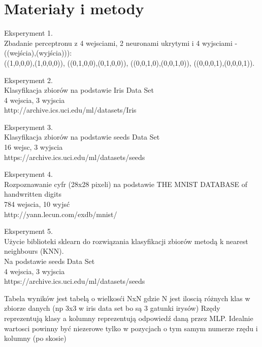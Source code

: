 \documentclass{classrep}
\begin{document}
\section{Materiały i metody}
{Eksperyment 1.\\
Zbadanie perceptronu z 4 wejsciami, 2 neuronami ukrytymi i 4 wyjsciami - ((wejścia),(wyjścia))):\\
((1,0,0,0),(1,0,0,0)), ((0,1,0,0),(0,1,0,0)), ((0,0,1,0),(0,0,1,0)), ((0,0,0,1),(0,0,0,1)).\\
}

{Eksperyment 2.\\
Klasyfikacja zbiorów na podstawie Iris Data Set\\
4 wejscia, 3 wyjscia\\
http://archive.ics.uci.edu/ml/datasets/Iris\\
}

{Eksperyment 3.\\
Klasyfikacja zbiorów na podstawie seeds Data Set \\
16 wejsc, 3 wyjscia\\
https://archive.ics.uci.edu/ml/datasets/seeds\\
}

{Eksperyment 4.\\
Rozpoznawanie cyfr (28x28 pixeli) na podstawie THE MNIST DATABASE
of handwritten digits\\
784 wejscia, 10 wyjsć\\
http://yann.lecun.com/exdb/mnist/\\
}

{Eksperyment 5.\\
Użycie biblioteki sklearn do rozwiązania klasyfikacji zbiorów metodą k nearest neighbours (KNN).\\
Na podstawie seeds Data Set \\
4 wejscia, 3 wyjscia\\
https://archive.ics.uci.edu/ml/datasets/seeds\\}

{
Tabela wyników jest tabelą o wielkosći NxN gdzie N jest iloscią różnych klas w zbiorze danych (np 3x3 w iris data set bo są 3 gatunki irysów)
Rzędy reprezentują klasy a kolumny reprezentują odpowiedź daną przez MLP. Idealnie wartosci powinny być niezerowe tylko w pozycjach o tym samym numerze rzędu i kolumny (po skosie)\\
}
\end{document}
